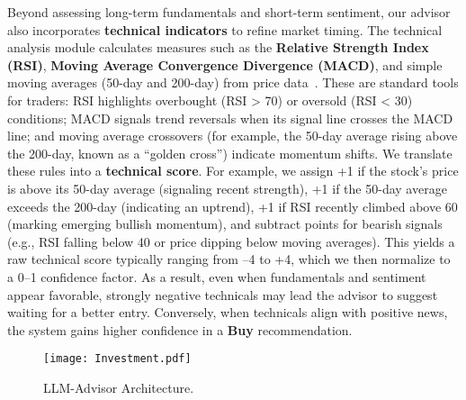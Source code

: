 \documentclass[conference]{IEEEtran}
\begin{document}
Beyond assessing long-term fundamentals and short-term sentiment, our advisor also incorporates \textbf{technical indicators} to refine market timing. The technical analysis module calculates measures such as the \textbf{Relative Strength Index (RSI)}, \textbf{Moving Average Convergence Divergence (MACD)}, and simple moving averages (50-day and 200-day) from price data~\cite{hossain2019}. These are standard tools for traders: RSI highlights overbought (RSI > 70) or oversold (RSI < 30) conditions; MACD signals trend reversals when its signal line crosses the MACD line; and moving average crossovers (for example, the 50-day average rising above the 200-day, known as a “golden cross”) indicate momentum shifts. We translate these rules into a \textbf{technical score}. For example, we assign +1 if the stock’s price is above its 50-day average (signaling recent strength), +1 if the 50-day average exceeds the 200-day (indicating an uptrend), +1 if RSI recently climbed above 60 (marking emerging bullish momentum), and subtract points for bearish signals (e.g., RSI falling below 40 or price dipping below moving averages). This yields a raw technical score typically ranging from –4 to +4, which we then normalize to a 0–1 confidence factor. As a result, even when fundamentals and sentiment appear favorable, strongly negative technicals may lead the advisor to suggest waiting for a better entry. Conversely, when technicals align with positive news, the system gains higher confidence in a \textbf{Buy} recommendation.
 


\begin{figure*}[htbp]
\centering
\texttt{[image: Investment.pdf]} %
\caption{LLM-Advisor Architecture.}
\label{fig:llm-advisor-architecture}
\end{figure*}
\end{document}
